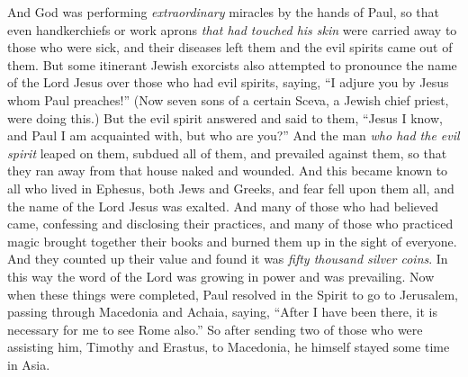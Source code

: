 \begin{biblechapter}
 And God was performing \textit{extraordinary} miracles by the hands of Paul,
\verse so that even handkerchiefs or work aprons \textit{that had touched his skin} were carried away to those who were sick, and their diseases left them and the evil spirits came out of them.
\verse But some itinerant Jewish exorcists also attempted to pronounce the name of the Lord Jesus over those who had evil spirits, saying, “I adjure you by Jesus whom Paul preaches!”
\verse (Now seven sons of a certain Sceva, a Jewish chief priest, were doing this.)
\verse But the evil spirit answered and said to them, “Jesus I know, and Paul I am acquainted with, but who are you?”
\verse And the man \textit{who had the evil spirit} leaped on them, subdued all of them, and prevailed against them, so that they ran away from that house naked and wounded.
\verse And this became known to all who lived in Ephesus, both Jews and Greeks, and fear fell upon them all, and the name of the Lord Jesus was exalted.
\verse And many of those who had believed came, confessing and disclosing their practices,
\verse and many of those who practiced magic brought together their books and burned them up in the sight of everyone. And they counted up their value and found it was \textit{fifty thousand silver coins}.
\verse In this way the word of the Lord was growing in power and was prevailing.
 Now when these things were completed, Paul resolved in the Spirit to go to Jerusalem, passing through Macedonia and Achaia, saying, “After I have been there, it is necessary for me to see Rome also.”
\verse So after sending two of those who were assisting him, Timothy and Erastus, to Macedonia, he himself stayed some time in Asia.

\end{biblechapter}
